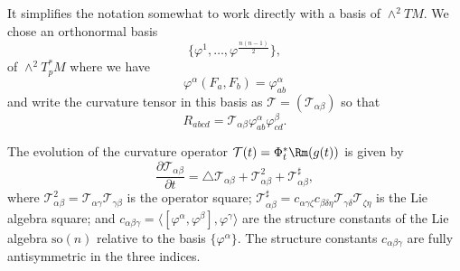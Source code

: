 It simplifies the notation somewhat to work directly with a basis of
$\wedge^2TM$. We chose an orthonormal basis
$$\{\varphi^{1},\ldots,\varphi^{\frac{n(n-1)}{2}}\},$$
of $\wedge^2T^*_pM$ where  we have \[ \varphi^{\alpha}(F_{a},F_{b})
= \varphi^{\alpha}_{ab} \] and write the curvature tensor in this
basis as ${\mathcal T} = ({\mathcal T}_{\alpha\beta})$ so that
\begin{equation}\label{Mdefn}
R_{abcd}={\mathcal
T}_{\alpha\beta}\varphi^{\alpha}_{ab}\varphi^{\beta}_{cd}.\end{equation}


\begin{proposition}\label{prop:curvature-operator-evolution}
\label{Mevol}

The evolution of the curvature operator ${\mathcal
T}(t)=\Phi_t^*\Rm(g(t))$ is given by
\[ \frac{\partial {\mathcal T}_{\alpha\beta}}{\partial t} = \triangle
{\mathcal T}_{\alpha\beta} + {\mathcal T}^{2}_{\alpha\beta} +
{\mathcal T}^{\sharp}_{\alpha\beta},
\] where ${\mathcal T}^{2}_{\alpha\beta}={\mathcal T}_{\alpha\gamma}{\mathcal
T}_{\gamma\beta}$ is the operator square; ${\mathcal T}^{\sharp}_{\alpha\beta}
 =
c_{\alpha\gamma\zeta}c_{\beta\delta\eta}{\mathcal T}_{\gamma\delta}{\mathcal
T}_{\zeta\eta}$ is the Lie algebra square; and $c_{\alpha\beta\gamma} =
\langle[\varphi^{\alpha},\varphi^{\beta}],\varphi^{\gamma}\rangle $ are the
structure constants of the Lie algebra $\mathrm{so}(n)$ relative to the basis
$\{\varphi^{\alpha}\}$. The structure constants $c_{\alpha\beta\gamma}$  are
fully antisymmetric in the three indices.
\end{proposition}

